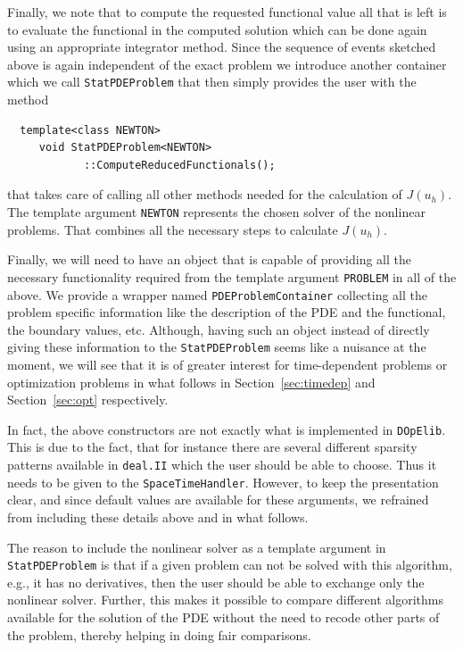 \documentclass[smallextended]{svjour3}       %
\numberwithin{equation}{section}
\newcommand{\deal}{\texttt{deal.II}}
\newcommand{\dope}{\texttt{DOpElib}}
\begin{document}
Finally, we note that to compute the requested functional value 
all that is left is to evaluate the functional in the computed solution 
which can be done again using an appropriate integrator method.
Since the sequence of events sketched above is again independent of the 
exact problem we introduce another container which we call 
\texttt{StatPDEProblem} that then simply provides the user with the 
method
\begin{lstlisting}
  template<class NEWTON>
     void StatPDEProblem<NEWTON>
            ::ComputeReducedFunctionals();
\end{lstlisting}
that takes care of calling all other methods needed for the calculation of 
$J(u_h)$.
The template argument \texttt{NEWTON} represents the chosen solver of the nonlinear problems.
That combines all the necessary steps to calculate $J(u_h)$. 

Finally, we will need to have an object that is capable of providing all 
the necessary functionality required from the template argument 
\texttt{PROBLEM} in all of the above. We provide a wrapper named
\texttt{PDEProblemContainer} collecting all the problem specific information 
like the description of the PDE and the functional, the boundary values, etc. 
Although, having such an object instead of directly giving these information
to the \texttt{StatPDEProblem} seems like a nuisance at the moment, we will 
see that it is of greater interest for time-dependent problems or 
optimization problems in what follows in Section~\ref{sec:timedep} and
Section~\ref{sec:opt} respectively. 

\begin{remark}
In fact, the above constructors are not exactly what is implemented in \dope{}.
This is due to the fact, that for instance 
there are several different sparsity patterns available in 
\deal{} which the user should be able to choose. Thus it needs to be 
given to the \texttt{SpaceTimeHandler}. However, to keep the 
presentation clear, and since default values are available for these arguments, 
we refrained from including these details above and in
what follows.
\end{remark} 

\begin{remark}
The reason to include the nonlinear solver as a template argument in 
\texttt{StatPDEProblem} is that if a given problem can not be solved with 
this algorithm, e.g., it has no derivatives, then the user should be able 
to exchange only the nonlinear solver. Further, this makes it possible to
compare different algorithms available for the solution of the PDE without 
the need to recode other parts of the problem, thereby helping in doing fair 
comparisons.
\end{remark}
\end{document}

